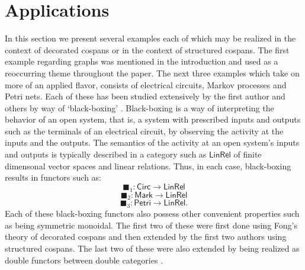 \documentclass{amsart}
\begin{document}
\section{Applications}\label{Applications}
In this section we present several examples each of which may be realized in the context of decorated cospans or in the context of structured cospans. The first example regarding graphs was mentioned in the introduction and used as a reoccurring theme throughout the paper. The next three examples which take on more of an applied flavor, consists of electrical circuits, Markov processes and Petri nets. Each of these has been studied extensively by the first author and others by way of `black-boxing' \cite{BCR,BF,BFP,BM,BP}. Black-boxing is a way of interpreting the behavior of an open system, that is, a system with prescribed inputs and outputs such as the terminals of an electrical circuit, by observing the activity at the inputs and the outputs. The semantics of the activity at an open system's inputs and outputs is typically described in a category such as $\mathsf{LinRel}$ of finite dimensonal vector spaces and linear relations. Thus, in each case, black-boxing results in functors such as: $$\blacksquare_1 \colon \mathsf{Circ} \to \mathsf{LinRel}$$ $$\blacksquare_2 \colon \mathsf{Mark} \to \mathsf{LinRel}$$ $$\blacksquare_3 \colon \mathsf{Petri} \to \mathsf{LinRel}.$$ Each of these black-boxing functors also possess other convenient properties such as being symmetric monoidal. The first two of these were first done using Fong's theory of decorated cospans and then extended by the first two authors using structured cospans. The last two of these were also extended by being realized as double functors between double categories \cite{BC,BM}.
\end{document}
